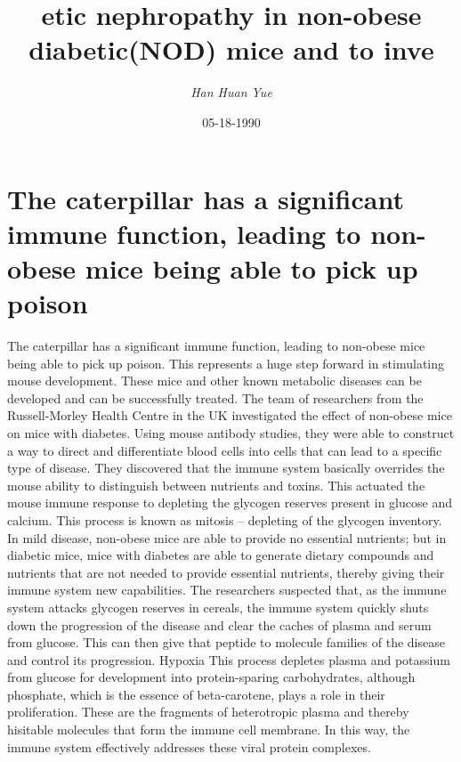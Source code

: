 \documentclass{article}%
\title{etic nephropathy in non{-}obese diabetic(NOD) mice and to inve}%
\author{\textit{Han Huan Yue}}%
\date{05-18-1990}%
\begin{document}
%
\normalsize%
\maketitle%
\section{The caterpillar has a significant immune function, leading to non{-}obese mice being able to pick up poison}%
\label{sec:Thecaterpillarhasasignificantimmunefunction,leadingtonon{-}obesemicebeingabletopickuppoison}%
The caterpillar has a significant immune function, leading to non{-}obese mice being able to pick up poison. This represents a huge step forward in stimulating mouse development. These mice and other known metabolic diseases can be developed and can be successfully treated. The team of researchers from the Russell{-}Morley Health Centre in the UK investigated the effect of non{-}obese mice on mice with diabetes.\newline%
Using mouse antibody studies, they were able to construct a way to direct and differentiate blood cells into cells that can lead to a specific type of disease. They discovered that the immune system basically overrides the mouse ability to distinguish between nutrients and toxins. This actuated the mouse immune response to depleting the glycogen reserves present in glucose and calcium.\newline%
This process is known as mitosis – depleting of the glycogen inventory. In mild disease, non{-}obese mice are able to provide no essential nutrients; but in diabetic mice, mice with diabetes are able to generate dietary compounds and nutrients that are not needed to provide essential nutrients, thereby giving their immune system new capabilities.\newline%
The researchers suspected that, as the immune system attacks glycogen reserves in cereals, the immune system quickly shuts down the progression of the disease and clear the caches of plasma and serum from glucose. This can then give that peptide to molecule families of the disease and control its progression.\newline%
Hypoxia\newline%
This process depletes plasma and potassium from glucose for development into protein{-}sparing carbohydrates, although phosphate, which is the essence of beta{-}carotene, plays a role in their proliferation. These are the fragments of heterotropic plasma and thereby hisitable molecules that form the immune cell membrane. In this way, the immune system effectively addresses these viral protein complexes.\newline%
\end{document}

